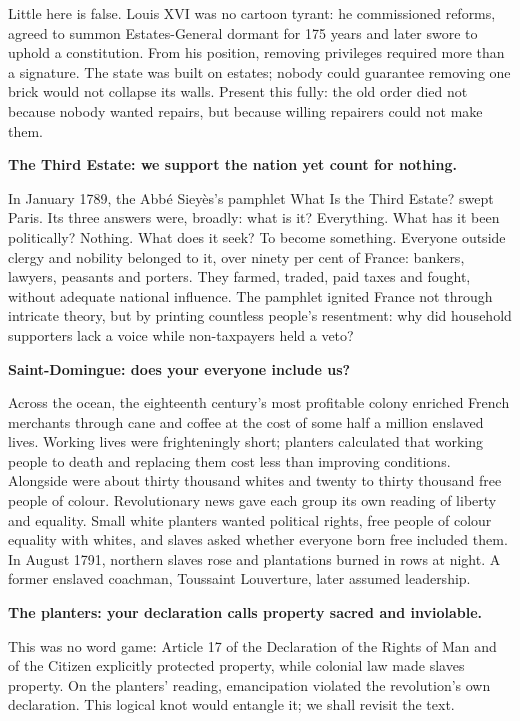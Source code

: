 Little here is false. Louis XVI was no cartoon tyrant: he commissioned reforms, agreed to summon Estates-General dormant for 175 years and later swore to uphold a constitution. From his position, removing privileges required more than a signature. The state was built on estates; nobody could guarantee removing one brick would not collapse its walls. Present this fully: the old order died not because nobody wanted repairs, but because willing repairers could not make them.

\textbf{The Third Estate: we support the nation yet count for nothing.}

In January 1789, the Abbé Sieyès's pamphlet What Is the Third Estate? swept Paris. Its three answers were, broadly: what is it? Everything. What has it been politically? Nothing. What does it seek? To become something. Everyone outside clergy and nobility belonged to it, over ninety per cent of France: bankers, lawyers, peasants and porters. They farmed, traded, paid taxes and fought, without adequate national influence. The pamphlet ignited France not through intricate theory, but by printing countless people's resentment: why did household supporters lack a voice while non-taxpayers held a veto?

\textbf{Saint-Domingue: does your everyone include us?}

Across the ocean, the eighteenth century's most profitable colony enriched French merchants through cane and coffee at the cost of some half a million enslaved lives. Working lives were frighteningly short; planters calculated that working people to death and replacing them cost less than improving conditions. Alongside were about thirty thousand whites and twenty to thirty thousand free people of colour. Revolutionary news gave each group its own reading of liberty and equality. Small white planters wanted political rights, free people of colour equality with whites, and slaves asked whether everyone born free included them. In August 1791, northern slaves rose and plantations burned in rows at night. A former enslaved coachman, Toussaint Louverture, later assumed leadership.

\textbf{The planters: your declaration calls property sacred and inviolable.}

This was no word game: Article 17 of the Declaration of the Rights of Man and of the Citizen explicitly protected property, while colonial law made slaves property. On the planters' reading, emancipation violated the revolution's own declaration. This logical knot would entangle it; we shall revisit the text.

